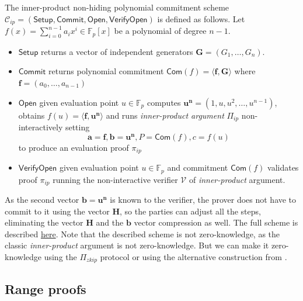 \documentclass[../lecture-notes-148x210.tex]{subfiles}
\begin{document}
\begin{definition}
    The inner-product non-hiding polynomial commitment scheme $\mathcal{C}_{ip} = (\mathsf{Setup, Commit, Open, VerifyOpen})$ is defined as follows. Let $f(x) = \sum_{i=0}^{n-1} a_i x^i \in \mathbb{F}_p[x]$ be a polynomial of degree $n-1$.
    \begin{itemize}
        \item $\mathsf{Setup}$ returns a vector of independent generators $\mathbf{G} = (G_1, \dots, G_n)$.
        \item $\mathsf{Commit}$ returns polynomial commitment $\mathsf{Com}(f) = \langle \mathbf{f}, \mathbf{G} \rangle$ where $\mathbf{f} = (a_0, \dots, a_{n-1})$
        \item $\mathsf{Open}$ given evaluation point $u \in \mathbb{F}_p$ computes $\mathbf{u^n} = (1, u, u^2, \dots, u^{n-1})$,  obtains $f(u) = \langle \mathbf{f, u^n} \rangle$ and runs \textit{inner-product argument} $\Pi_{ip}$ non-interactively setting 
        $$\mathbf{a} = \mathbf{f}, \mathbf{b} = \mathbf{u^n}, P = \mathsf{Com}(f), c = f(u)$$ 
        to produce an evaluation proof $\pi_{ip}$
        \item $\mathsf{VerifyOpen}$ given evaluation point $u \in \mathbb{F}_p$ and commitment $\mathsf{Com}(f)$ validates proof $\pi_{ip}$ running the non-interactive verifier $\mathcal{V}$ of \textit{inner-product} argument.
    \end{itemize}
\end{definition}

\begin{remark}
    As the second vector $\mathbf{b} = \mathbf{u^n}$ is known to the verifier, the prover does not have to commit to it using the vector $\mathbf{H}$, so the parties can adjust all the steps, eliminating the vector $\mathbf{H}$ and the $\mathbf{b}$ vector compression as well. The full scheme is described \href{https://www.zkdocs.com/docs/zkdocs/commitments/ipa-pcs/}{here}. Note that the described scheme is not zero-knowledge, as the classic \textit{inner-product} argument is not zero-knowledge. But we can make it zero-knowledge using the $\Pi_{zkip}$ protocol or using the alternative construction from .
\end{remark}

\subsection{Range proofs}\label{subsection:bulletproofs-range-proofs}
\end{document}
